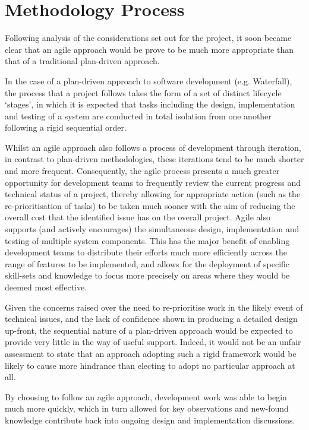 \section{Methodology Process}

Following analysis of the considerations set out for the project, it soon became clear that an agile approach would be prove to be much more appropriate than that of a traditional plan-driven approach.

In the case of a plan-driven approach to software development (e.g. Waterfall), the process that a project follows takes the form of a set of distinct lifecycle `stages', in which it is expected that tasks including the design, implementation and testing of a system are conducted in total isolation from one another following a rigid sequential order.

Whilst an agile approach also follows a process of development through iteration, in contrast to plan-driven methodologies, these iterations tend to be much shorter and more frequent. Consequently, the agile process presents a much greater opportunity for development teams to frequently review the current progress and technical status of a project, thereby allowing for appropriate action (such as the re-prioritisation of tasks) to be taken much sooner with the aim of reducing the overall cost that the identified issue has on the overall project. Agile also supports (and actively encourages) the simultaneous design, implementation and testing of multiple system components. This has the major benefit of enabling development teams to distribute their efforts much more efficiently across the range of features to be implemented, and allows for the deployment of specific skill-sets and knowledge to focus more precisely on areas where they would be deemed most effective.

Given the concerns raised over the need to re-prioritise work in the likely event of technical issues, and the lack of confidence shown in producing a detailed design up-front, the sequential nature of a plan-driven approach would be expected to provide very little in the way of useful support. Indeed, it would not be an unfair assessment to state that an approach adopting such a rigid framework would be likely to cause more hindrance than electing to adopt no particular approach at all.

 By choosing to follow an agile approach, development work was able to begin much more quickly, which in turn allowed for key observations and new-found knowledge contribute back into ongoing design and implementation discussions.


